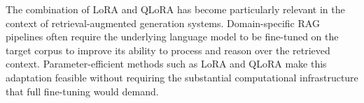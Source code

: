 The combination of LoRA and QLoRA has become particularly relevant in the context of retrieval-augmented generation systems. Domain-specific RAG pipelines often require the underlying language model to be fine-tuned on the target corpus to improve its ability to process and reason over the retrieved context. Parameter-efficient methods such as LoRA and QLoRA make this adaptation feasible without requiring the substantial computational infrastructure that full fine-tuning would demand.